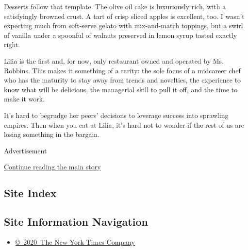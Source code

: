 Desserts follow that template. The olive oil cake is luxuriously rich,
with a satisfyingly browned crust. A tart of crisp sliced apples is
excellent, too. I wasn't expecting much from soft-serve gelato with
mix-and-match toppings, but a swirl of vanilla under a spoonful of
walnuts preserved in lemon syrup tasted exactly right.

Lilia is the first and, for now, only restaurant owned and operated by
Ms. Robbins. This makes it something of a rarity: the sole focus of a
midcareer chef who has the maturity to stay away from trends and
novelties, the experience to know what will be delicious, the managerial
skill to pull it off, and the time to make it work.

It's hard to begrudge her peers' decisions to leverage success into
sprawling empires. Then when you eat at Lilia, it's hard not to wonder
if the rest of us are losing something in the bargain.

Advertisement

\protect\hyperlink{after-bottom}{Continue reading the main story}

\hypertarget{site-index}{%
\subsection{Site Index}\label{site-index}}

\hypertarget{site-information-navigation}{%
\subsection{Site Information
Navigation}\label{site-information-navigation}}

\begin{itemize}
\tightlist
\item
  \href{https://help.nytimes3xbfgragh.onion/hc/en-us/articles/115014792127-Copyright-notice}{©~2020~The
  New York Times Company}
\end{itemize}

